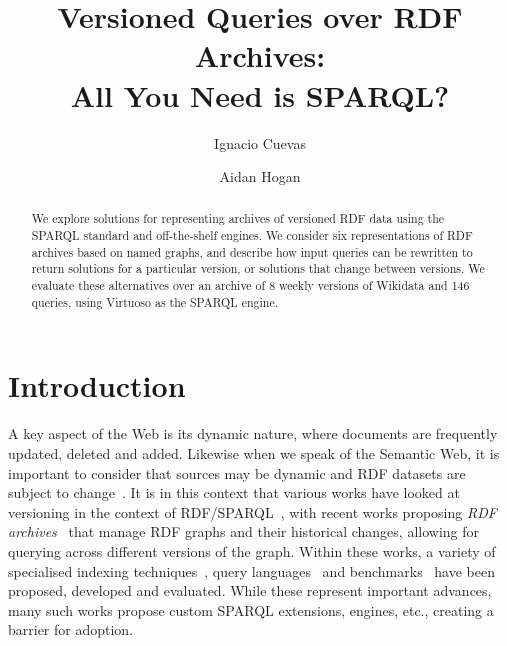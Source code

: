 \documentclass{llncs}
\begin{document}
\title{Versioned Queries over RDF Archives:\\All You Need is SPARQL?}

\author{Ignacio Cuevas \and Aidan Hogan}

\maketitle

\begin{abstract}
We explore solutions for representing archives of versioned RDF data using the SPARQL standard and off-the-shelf engines. We consider six representations of RDF archives based on named graphs, and describe how input queries can be rewritten to return solutions for a particular version, or solutions that change between versions. We evaluate these alternatives over an archive of 8 weekly versions of Wikidata and 146 queries, using Virtuoso as the SPARQL engine.
\end{abstract}


\section{Introduction}

A key aspect of the Web is its dynamic nature, where documents are frequently updated, deleted and added. Likewise when we speak of the Semantic Web, it is important to consider that sources may be dynamic and RDF datasets are subject to change~\cite{KaferAUOH13}. It is in this context that various works have looked at versioning in the context of RDF/SPARQL~\cite{VolkelG06,TappoletB09,Grandi10,GraubeHU14,KhuranaD16}, with recent works proposing \textit{RDF archives}~\cite{FernandezPU15,Cerdeira-PenaFF16,BahriLA18,FernandezUPK19,TaelmanSHMV19} that manage RDF graphs and their historical changes, allowing for querying across different versions of the graph. Within these works, a variety of specialised indexing techniques~\cite{Cerdeira-PenaFF16,BahriLA18,TaelmanSHMV19}, query languages~\cite{TappoletB09} and benchmarks~\cite{KotsevMPEFK16,FernandezUPK19} have been proposed, developed and evaluated. While these represent important advances, many such works propose custom SPARQL extensions, engines, etc., creating a barrier for adoption.
\end{document}

